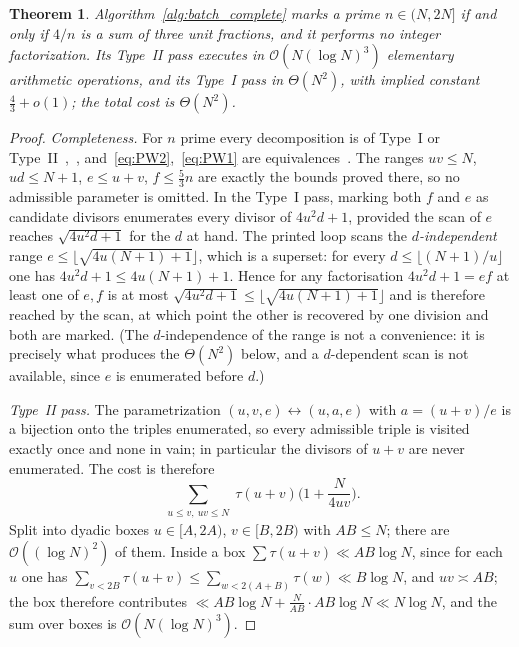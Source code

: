 \documentclass[11pt, a4paper]{article}
\theoremstyle{plain}
\newtheorem{theorem}{Theorem}[section]
\theoremstyle{definition}
\begin{document}
\begin{theorem}\label{thm:batch_complete}
Algorithm~\ref{alg:batch_complete} marks a prime $n\in(N,2N]$ if and only if $4/n$ is a sum of three unit fractions, and it performs no integer factorization. Its Type~II pass executes in $\mathcal{O}(N(\log N)^{3})$ elementary arithmetic operations, and its Type~I pass in $\Theta(N^{2})$, with implied constant $\tfrac43+o(1)$; the total cost is $\Theta(N^{2})$.
\end{theorem}
\begin{proof}
\emph{Completeness.} For $n$ prime every decomposition is of Type~I or Type~II~\cite[\S2]{elsholtz2013},~\cite[\S2]{pomerance2026}, and~\eqref{eq:PW2},~\eqref{eq:PW1} are equivalences~\cite[Cor.~2.2, Cor.~2.4]{pomerance2026}. The ranges $uv\le N$, $ud\le N+1$, $e\le u+v$, $f\le\frac53n$ are exactly the bounds proved there, so no admissible parameter is omitted. In the Type~I pass, marking both $f$ and $e$ as candidate divisors enumerates every divisor of $4u^{2}d+1$, provided the scan of $e$ reaches $\sqrt{4u^{2}d+1}$ for the $d$ at hand. The printed loop scans the \emph{$d$-independent} range $e\le\lfloor\sqrt{4u(N+1)+1}\rfloor$, which is a superset: for every $d\le\lfloor(N+1)/u\rfloor$ one has $4u^{2}d+1\le 4u(N+1)+1$. Hence for any factorisation $4u^{2}d+1=ef$ at least one of $e,f$ is at most $\sqrt{4u^{2}d+1}\le\lfloor\sqrt{4u(N+1)+1}\rfloor$ and is therefore reached by the scan, at which point the other is recovered by one division and both are marked. (The $d$-independence of the range is not a convenience: it is precisely what produces the $\Theta(N^{2})$ below, and a $d$-dependent scan is not available, since $e$ is enumerated before $d$.)

\emph{Type~II pass.} The parametrization $(u,v,e)\leftrightarrow(u,a,e)$ with $a=(u+v)/e$ is a bijection onto the triples enumerated, so every admissible triple is visited exactly once and none in vain; in particular the divisors of $u+v$ are never enumerated. The cost is therefore
$$\sum_{\substack{u\le v,\ uv\le N}}\tau(u+v)\Big(1+\frac{N}{4uv}\Big).$$
Split into dyadic boxes $u\in[A,2A)$, $v\in[B,2B)$ with $AB\le N$; there are $\mathcal{O}((\log N)^{2})$ of them. Inside a box $\sum \tau(u+v)\ll AB\log N$, since for each $u$ one has $\sum_{v<2B}\tau(u+v)\le\sum_{w<2(A+B)}\tau(w)\ll B\log N$, and $uv\asymp AB$; the box therefore contributes $\ll AB\log N+\frac{N}{AB}\cdot AB\log N\ll N\log N$, and the sum over boxes is $\mathcal{O}(N(\log N)^{3})$.


\end{proof}
\end{document}
